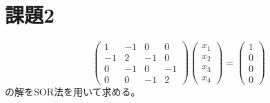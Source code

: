 \documentclass{jsarticle}
\begin{document}
\section{課題2}
\begin{equation}
  \left(
  \begin{array}{rrrr}
      1 & -1 & 0& 0\\
      -1 & 2 & -1 & 0\\
      0 & -1 & 0 & -1\\
      0 & 0 & -1 & 2 
  \end{array}
  \right)
  \left(
  \begin{array}{r}
      x_1\\
      x_2\\
      x_3\\
      x_4 
  \end{array}
  \right)
  =
  \left(
  \begin{array}{r}
      1\\
      0\\
      0\\
      0
  \end{array}
  \right)
\end{equation}
の解をSOR法を用いて求める。
\end{document}
